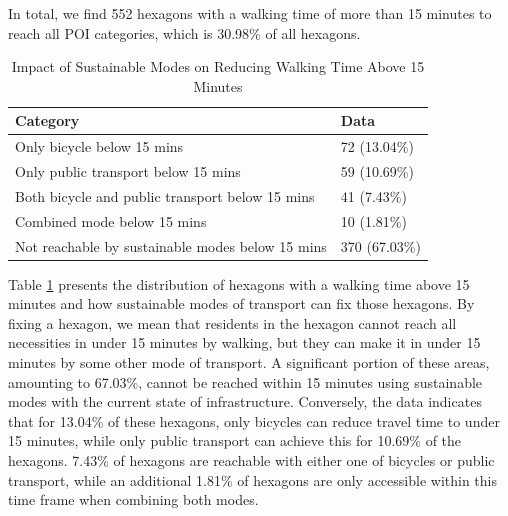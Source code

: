 In total, we find 552 hexagons with a walking time of more than 15 minutes to reach all POI categories, which is 30.98\% of all hexagons.
\begin{table}[h]
  \centering
  \begin{tabular}{|l|l|}
    \hline
    \textbf{Category}                                          & \textbf{Data}                \\ \hline
    Only bicycle below 15 mins                                 & 72 (13.04\%)                 \\ \hline
    Only public transport below 15 mins                        & 59 (10.69\%)                 \\ \hline
    Both bicycle and public transport below 15 mins            & 41 (7.43\%)                  \\ \hline
    Combined mode below 15 mins                                & 10 (1.81\%)                  \\ \hline
    Not reachable by sustainable modes below 15 mins           & 370 (67.03\%)                \\ \hline
  \end{tabular}
  \caption{Impact of Sustainable Modes on Reducing Walking Time Above 15 Minutes}
  \label{table:hexagons_with_walking_time_above_15_minutes}
\end{table}
Table \ref{table:hexagons_with_walking_time_above_15_minutes} presents the distribution of hexagons with a walking time above 15 minutes and how sustainable modes of transport can fix those hexagons.
By fixing a hexagon, we mean that residents in the hexagon cannot reach all necessities in under 15 minutes by walking, but they can make it in under 15 minutes by some other mode of transport.
A significant portion of these areas, amounting to 67.03\%, cannot be reached within 15 minutes using sustainable modes with the current state of infrastructure. 
Conversely, the data indicates that for 13.04\% of these hexagons, only bicycles can reduce travel time to under 15 minutes, while only public transport can achieve this for 10.69\% of the hexagons. 
7.43\% of hexagons are reachable with either one of bicycles or public transport, while an additional 1.81\% of hexagons are only accessible within this time frame when combining both modes. 


